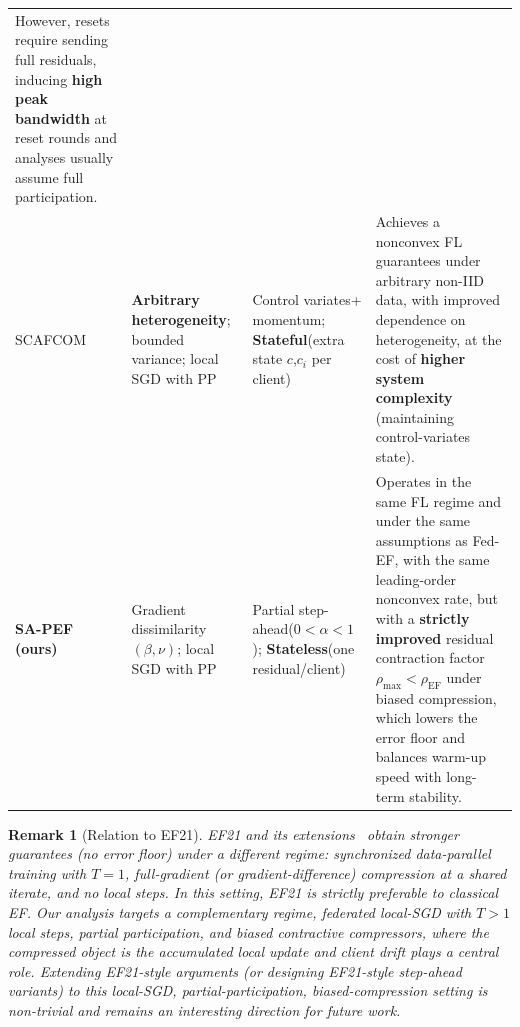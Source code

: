 \documentclass{article} %
\newtheorem{remark}{Remark}
\begin{document}
\begin{table}[t]
\begin{tabular}{p{1.2cm} p{2.1cm} p{2.6cm} p{7.22cm}}
However, resets require sending full residuals, inducing \textbf{high peak bandwidth} at reset rounds and analyses usually assume full participation. \\
[0.4em]
SCAFCOM\newline \citep{huang2024stochastic}
& \textbf{Arbitrary heterogeneity}; bounded variance; local SGD with PP
& Control variates\newline + momentum; \newline \textbf{Stateful}\newline (extra state $c$,$c_i$ per client)
& Achieves a nonconvex FL guarantees under arbitrary non-IID data, with improved dependence on heterogeneity, \newline
at the cost of \textbf{higher system complexity} (maintaining control-variates state). \\
[0.4em]
\textbf{SA-PEF (ours)}
& Gradient dissimilarity $(\beta,\nu)$; local SGD with PP
& Partial step-ahead\newline ($0<\alpha<1$); \newline \textbf{Stateless}\newline (one residual/client)
& Operates in the same FL regime and under the same assumptions as Fed-EF, with the same leading-order nonconvex rate, \newline
but with a \textbf{strictly improved} residual contraction factor $\rho_{\max} < \rho_{\text{EF}}$ under biased compression, which lowers the error floor and balances warm-up speed with long-term stability. \\
\bottomrule
\end{tabular}
\label{tab:rate-comparison}
\end{table}

\begin{remark}[Relation to EF21]
EF21 and its extensions~\citep{richtarik2021ef21,fatkhullin2025ef21bells} obtain stronger guarantees (no error floor) under a different regime: synchronized data-parallel training with $T{=}1$, full-gradient (or gradient-difference) compression at a shared iterate, and no local steps. In this setting, EF21 is strictly preferable to classical EF. Our analysis targets a complementary regime, federated local-SGD with $T>1$ local steps, partial participation, and biased contractive compressors, where the compressed object is the accumulated local update and client drift plays a central role. Extending EF21-style arguments (or designing EF21-style step-ahead variants) to this local-SGD, partial-participation, biased-compression setting is non-trivial and remains an interesting direction for future work.
\end{remark}
\end{document}
